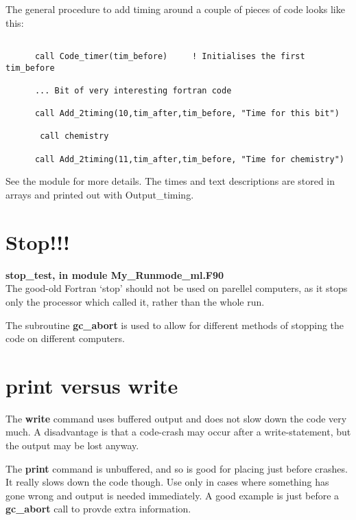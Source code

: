 The general procedure to add timing  around a couple of pieces of code looks like
this:

  \begin{verbatim}

      call Code_timer(tim_before)     ! Initialises the first tim_before

      ... Bit of very interesting fortran code

      call Add_2timing(10,tim_after,tim_before, "Time for this bit")

       call chemistry

      call Add_2timing(11,tim_after,tim_before, "Time for chemistry")

  \end{verbatim}


See the module for more details. The times and text descriptions are stored
in arrays and printed out with Output\_timing.



\section{Stop!!!}

{\bf stop\_test, in module My\_Runmode\_ml.F90}\\

The good-old Fortran `stop' should not be used on
parellel computers, as it stops only the processor which called  it,
rather than the whole run.


The subroutine {\bf gc\_abort} is used to allow for
different methods of stopping the code on different
computers.



\section{print versus write}

The {\bf write} command uses buffered output and does not slow down the code
very much. A disadvantage is that a code-crash  may occur after a write-statement, but
the output may be lost anyway.

The {\bf print} command is unbuffered, and so is good for placing just before crashes.
It really slows down the code though. Use only in cases where something has gone
wrong and output is needed immediately. A good example is just before a
{\bf gc\_abort} call to provde extra information.


\newpage
